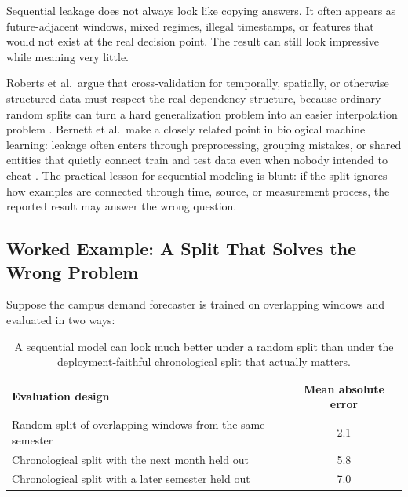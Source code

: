 \begin{failurebox}
Sequential leakage does not always look like copying answers. It often appears as future-adjacent windows, mixed regimes, illegal timestamps, or features that would not exist at the real decision point. The result can still look impressive while meaning very little.
\end{failurebox}

\begin{example}
Roberts et al.\ argue that cross-validation for temporally, spatially, or otherwise structured data must respect the real dependency structure, because ordinary random splits can turn a hard generalization problem into an easier interpolation problem \citep{roberts2017}. Bernett et al.\ make a closely related point in biological machine learning: leakage often enters through preprocessing, grouping mistakes, or shared entities that quietly connect train and test data even when nobody intended to cheat \citep{bernett2024}. The practical lesson for sequential modeling is blunt: if the split ignores how examples are connected through time, source, or measurement process, the reported result may answer the wrong question.
\end{example}

\subsection{Worked Example: A Split That Solves the Wrong Problem}

Suppose the campus demand forecaster is trained on overlapping windows and evaluated in two ways:

\begin{table}[t]
\centering
\small
\setlength{\tabcolsep}{4pt}
\begin{tabular}{L{6.9cm}c}
\toprule
Evaluation design & Mean absolute error \\
\midrule
Random split of overlapping windows from the same semester & 2.1 \\
Chronological split with the next month held out & 5.8 \\
Chronological split with a later semester held out & 7.0 \\
\bottomrule
\end{tabular}
\caption{A sequential model can look much better under a random split than under the deployment-faithful chronological split that actually matters.}
\label{tab:forecasting-split-leakage}
\end{table}


